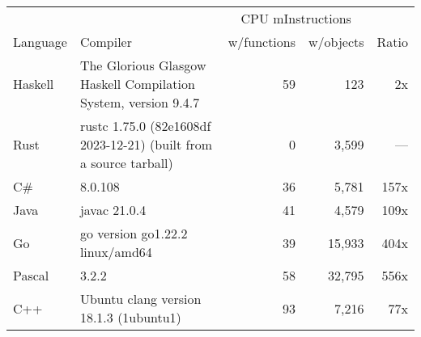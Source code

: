\documentclass{article}
\begin{document}
      \begin{tabularx}{\linewidth}{lXrrr}
      \toprule
        & & \multicolumn{2}{c}{CPU mInstructions} & \\
        Language & Compiler & w/functions & w/objects & Ratio \\
      \midrule
    Haskell & The Glorious Glasgow Haskell Compilation System, version 9.4.7 & 59 & 123 & 2x \\
Rust & rustc 1.75.0 (82e1608df 2023-12-21) (built from a source tarball) & 0 & 3,599 & --- \\
C\# & 8.0.108 & 36 & 5,781 & 157x \\
Java & javac 21.0.4 & 41 & 4,579 & 109x \\
Go & go version go1.22.2 linux/amd64 & 39 & 15,933 & 404x \\
Pascal & 3.2.2 & 58 & 32,795 & 556x \\
C++ & Ubuntu clang version 18.1.3 (1ubuntu1) & 93 & 7,216 & 77x \\

      \bottomrule
      \end{tabularx}
      
\end{document}
